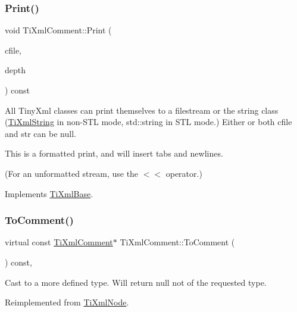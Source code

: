 \subsubsection{\texorpdfstring{Print()}{Print()}}
{\footnotesize\ttfamily void Ti\+Xml\+Comment\+::\+Print (\begin{DoxyParamCaption}\item[{F\+I\+LE $\ast$}]{cfile,  }\item[{int}]{depth }\end{DoxyParamCaption}) const\hspace{0.3cm}{\ttfamily [virtual]}}

All Tiny\+Xml classes can print themselves to a filestream or the string class (\hyperlink{class_ti_xml_string}{Ti\+Xml\+String} in non-\/\+S\+TL mode, std\+::string in S\+TL mode.) Either or both cfile and str can be null.

This is a formatted print, and will insert tabs and newlines.

(For an unformatted stream, use the $<$$<$ operator.) 

Implements \hyperlink{class_ti_xml_base_a0de56b3f2ef14c65091a3b916437b512}{Ti\+Xml\+Base}.

\mbox{\label{class_ti_xml_comment_a1032e176d3eb73017ceabc698cac0f16}} 
\subsubsection{\texorpdfstring{To\+Comment()}{ToComment()}\hspace{0.1cm}{\footnotesize\ttfamily [1/2]}}
{\footnotesize\ttfamily virtual const \hyperlink{class_ti_xml_comment}{Ti\+Xml\+Comment}$\ast$ Ti\+Xml\+Comment\+::\+To\+Comment (\begin{DoxyParamCaption}{ }\end{DoxyParamCaption}) const\hspace{0.3cm}{\ttfamily [inline]}, {\ttfamily [virtual]}}



Cast to a more defined type. Will return null not of the requested type. 



Reimplemented from \hyperlink{class_ti_xml_node_a5ad43b9d545315e9bb4f50d4cb70de9e}{Ti\+Xml\+Node}.

\mbox{\label{class_ti_xml_comment_acc7c7e07e13c23f17797d642981511df}} 
